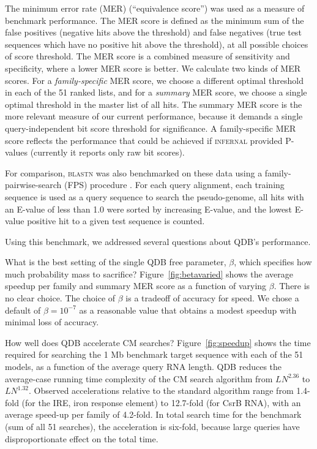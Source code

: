 \documentclass[11pt]{article}
\newif\ifdraft
\begin{document}
The minimum error rate (MER) (``equivalence score'') \cite{Pearson95}
was used as a measure of benchmark performance. The MER score is
defined as the minimum sum of the false positives (negative hits above
the threshold) and false negatives (true test sequences which have no
positive hit above the threshold), at all possible choices of score
threshold. The MER score is a combined measure of sensitivity and
specificity, where a lower MER score is better. We calculate two kinds
of MER scores. For a \emph{family-specific} MER score, we choose a
different optimal threshold in each of the 51 ranked lists, and for a
\emph{summary} MER score, we choose a single optimal threshold in the
master list of all hits. The summary MER score is the more relevant
measure of our current performance, because it demands a single
query-independent bit score threshold for significance. A
family-specific MER score reflects the performance that could be
achieved if \textsc{infernal} provided P-values (currently it reports
only raw bit scores).

For comparison, \textsc{blastn} was also benchmarked on these data
using a family-pairwise-search (FPS) procedure \cite{Grundy98b}. For each
query alignment, each training sequence is used as a query sequence to
search the pseudo-genome, all hits with an E-value of less than 1.0
were sorted by increasing E-value, and the lowest E-value positive hit
to a given test sequence is counted.

Using this benchmark, we addressed several questions about QDB's
performance.

What is the best setting of the single QDB free parameter, $\beta$,
which specifies how much probability mass to sacrifice?
Figure~\ref{fig:betavaried} shows the average speedup per family and
summary MER score as a function of varying $\beta$. There is no clear
choice. The choice of $\beta$ is a tradeoff of accuracy for speed. We
chose a default of $\beta = 10^{-7}$ as a reasonable value that
obtains a modest speedup with minimal loss of accuracy.

\ifdraft

\fi

How well does QDB accelerate CM searches?  Figure~\ref{fig:speedup}
shows the time required for searching the 1 Mb benchmark target
sequence with each of the 51 models, as a function of the average
query RNA length. QDB reduces the average-case running time complexity
of the CM search algorithm from $LN^{2.36}$ to $LN^{1.32}$. Observed
accelerations relative to the standard algorithm range from 1.4-fold
(for the IRE, iron response element) to 12.7-fold (for CsrB RNA), with
an average speed-up per family of 4.2-fold. In total search time for
the benchmark (sum of all 51 searches), the acceleration is six-fold,
because large queries have disproportionate effect on the total
time.
\end{document}

